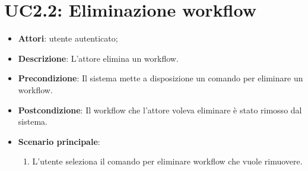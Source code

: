 \section{UC2.2: Eliminazione workflow}
\label{UC2.2}
\begin{itemize}
	\item \textbf{Attori}: utente autenticato;
	\item \textbf{Descrizione}: L'attore elimina un workflow.
	\item \textbf{Precondizione}: Il sistema mette a disposizione un comando per eliminare un workflow.
	\item \textbf{Postcondizione}: Il workflow che l'attore voleva eliminare è stato rimosso dal sistema.
	\item \textbf{Scenario principale}:
	\begin{enumerate} \item L'utente seleziona il comando per eliminare workflow che vuole rimuovere.\end{enumerate}
\end{itemize}

